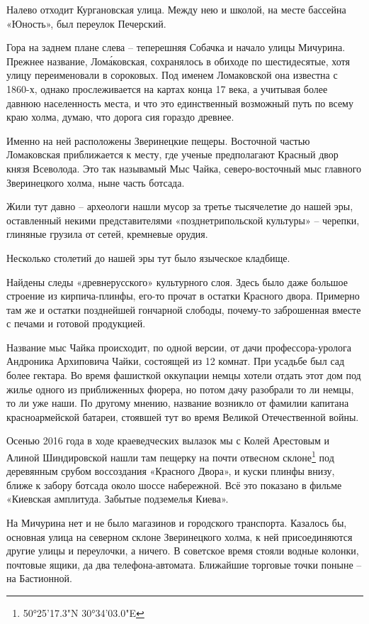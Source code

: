 Налево отходит Кургановская улица. Между нею и школой, на месте бассейна «Юность», был переулок Печерский.

Гора на заднем плане слева – теперешняя Собачка и начало улицы Мичурина. Прежнее название, Лом\'аковская, сохранялось в обиходе по шестидесятые, хотя улицу переименовали в сороковых. Под именем Ломаковской она известна с 1860-х, однако прослеживается на картах конца 17 века, а учитывая более давнюю населенность места, и что это единственный возможный путь по всему краю холма, думаю, что дорога сия гораздо древнее.

Именно на ней расположены Зверинецкие пещеры. Восточной частью Ломаковская приближается к месту, где ученые предполагают Красный двор князя Всеволода. Это так называмый Мыс Чайка, северо-восточный мыс главного Зверинецкого холма, ныне часть ботсада.

Жили тут давно – археологи нашли мусор за третье тысячелетие до нашей эры, оставленный некими представителями «позднетрипольской культуры» – черепки, глиняные грузила от сетей, кремневые орудия.

Несколько столетий до нашей эры тут было языческое кладбище.  

 Найдены следы «древнерусского» культурного слоя. Здесь было даже большое строение из кирпича-плинфы, его-то прочат в остатки Красного двора. Примерно там же и остатки позднейшей гончарной слободы, почему-то заброшенная вместе с печами и готовой продукцией.

Название мыс Чайка происходит, по одной версии, от дачи профессора-уролога Андроника Архиповича Чайки, состоящей из 12 комнат. При усадьбе был сад более гектара. Во время фашисткой оккупации немцы хотели отдать этот дом под жилье одного из приближенных фюрера, но потом дачу разобрали то ли немцы, то ли уже наши. По другому мнению, название возникло от фамилии капитана красноармейской батареи, стоявшей тут во время Великой Отечественной войны.

Осенью 2016 года в ходе краеведческих вылазок мы с Колей Арестовым и Алиной Шиндировской нашли там пещерку на почти отвесном склоне\footnote{50°25'17.3"N 30°34'03.0"E} под деревянным срубом воссоздания «Красного Двора», и куски плинфы внизу, ближе к забору ботсада около шоссе набережной. Всё это показано в фильме «Киевская амплитуда. Забытые подземелья Киева».

На Мичурина нет и не было магазинов и городского транспорта. Казалось бы, основная улица на северном склоне Зверинецкого холма, к ней присоединяются другие улицы и переулочки, а ничего. В советское время стояли водные колонки, почтовые ящики, да два телефона-автомата. Ближайшие торговые точки поныне – на Бастионной.

